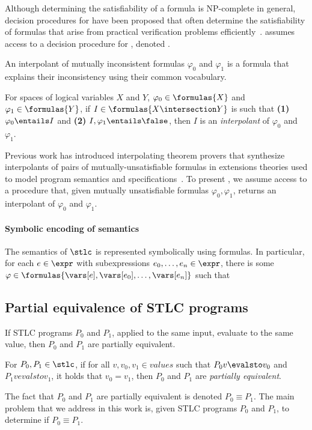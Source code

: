 Although determining the satisfiability of a \lia formula is
NP-complete in general, decision procedures for \lia have been
proposed that often determine the satisfiability of formulas that
arise from practical verification problems
efficiently~\cite{demoura08}.
%
\sys assumes access to a decision procedure for \lia, denoted \issat.

An interpolant of mutually inconsistent formulas $\varphi_0$ and
$\varphi_1$ is a \lia formula that explains their inconsistency using
their common vocabulary.
%
\begin{defn}
  \label{defn:itps}
  For spaces of logical variables $X$ and $Y$,
  $\varphi_0 \in \formulas{X}$ and
  $\varphi_1 \in \formulas{Y}$,
  if $I \in \formulas{X \intersection Y}$ is such that 
  \textbf{(1)} $\varphi_0 \entails I$ and %
  \textbf{(2)} $I, \varphi_1 \entails \false$, then $I$ is an
  \emph{interpolant} of $\varphi_0$ and $\varphi_1$.
\end{defn}
%
Previous work has introduced interpolating theorem provers that
synthesize interpolants of pairs of mutually-unsatisfiable formulas in
extensions theories used to model program semantics and
specifications~\cite{mcmillan04}.
%
To present \sys, we assume access to a procedure \solveitp that, given
mutually unsatisfiable \lia formulas $\varphi_0, \varphi_1$, returns
an interpolant of $\varphi_0$ and $\varphi_1$.

\paragraph{Symbolic encoding of semantics}
%
The semantics of $\stlc$ is represented symbolically using \lia
formulas.
%
%
In particular, for each $e \in \expr$ with subexpressions $e_0,
\ldots, e_n \in \expr$, there is some $\varphi \in \formulas{\vars[e],
  \vars[e_0], \ldots, \vars[e_n]}$ such that


\subsection{Partial equivalence of STLC programs}
\label{sec:peq}
%
If STLC programs $P_0$ and $P_1$, applied to the same input, evaluate
to the same value, then $P_0$ and $P_1$ are partially equivalent.
%
\begin{defn}
  \label{defn:peq}
  For $P_0, P_1 \in \stlc$, if for all $v, v_0, v_1 \in values$ such
  that $P_0 v \evalsto v_0$ and $P_1 v evalsto v_1$, it holds that
  $v_0 = v_1$, then $P_0$ and $P_1$ are \emph{partially equivalent}.
\end{defn}
%
The fact that $P_0$ and $P_1$ are partially equivalent is denoted $P_0
\equiv P_1$.
%
The main problem that we address in this work is, given STLC programs
$P_0$ and $P_1$, to determine if $P_0 \equiv P_1$.

